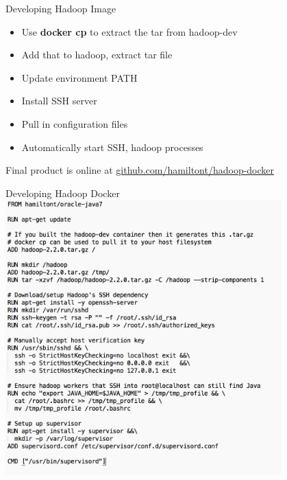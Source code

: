\documentclass[xcolor=dvipsnames]{beamer}
\newcommand{\cpause}{}
\begin{document}
\begin{frame}{Developing Hadoop Image}
  
  \vspace{-5mm}
  \begin{itemize}
    \item Use \textbf{docker cp} to extract the tar from hadoop-dev \cpause
    \item Add that to hadoop, extract tar file \cpause
    \item Update environment PATH \cpause
    \item Install SSH server \cpause
    \item Pull in configuration files
    \item Automatically start SSH, hadoop processes \cpause
  \end{itemize}

  Final product is online at \url{github.com/hamiltont/hadoop-docker}

\end{frame}

\begin{frame}{Developing Hadoop Docker}
  \centering
  \includegraphics[width=0.8\textwidth]{figures/hadoop.png}
\end{frame}
\end{document}
